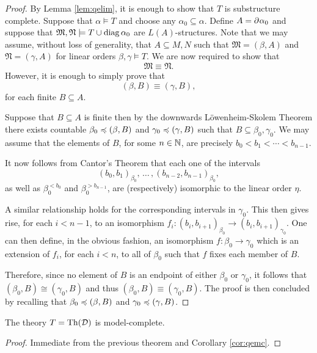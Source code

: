 \begin{proof} By Lemma \ref{lem:qelim}, it is enough to show that $T$ is
	substructure complete.  Suppose that $\alpha\models T$ and choose any
	$\alpha_0\subseteq\alpha$.  Define $A=\partial^{}{}\alpha_0$ and suppose that
	$\mathfrak{M},\mathfrak{N}\models T\cup\operatorname{diag}{\alpha_0}$ are $L(A)$-structures.
	Note that we may assume, without loss of generality, that $A\subseteq M,N$ such
	that $\mathfrak{M}=(\beta,A)$ and $\mathfrak{N}=(\gamma,A)$ for linear orders
	$\beta,\gamma\models T$.
	We are now required to show that
	\begin{equation}
		\mathfrak{M}\equiv\mathfrak{N}.
	\end{equation}
	However, it is enough to simply prove that
	\begin{equation}
		(\beta,B)\equiv(\gamma,B),
	\end{equation}
	for each finite $B\subseteq A$.

	Suppose that $B\subseteq A$ is finite then by the downwards
	L\"owenheim-Skolem Theorem there exists countable $\beta_0\preccurlyeq(\beta,B)$ and
	$\gamma_0\preccurlyeq(\gamma,B)$ such that $B\subseteq\beta_0,\gamma_0$.  We may assume
	that the elements of $B$, for some $n\in\mathbb{N}$, are precisely
	$b_0<b_1<\dotsb<b_{n-1}$.

	It now follows from Cantor's Theorem that each one of the intervals
	\begin{equation}
		(b_0,b_1)_{\beta_0},\,\dotsc\,,(b_{n-2},b_{n-1})_{\beta_0},
	\end{equation}
	as well as $\beta_0^{<b_0}$ and $\beta_0^{>b_{n-1}}$, are (respectively)
	isomorphic to the linear order $\eta$.

	A similar relationship holds for the corresponding intervals in $\gamma_0$.
	This then gives rise, for each $i<n-1$, to an isomorphism
	$f_{i}\colon(b_{i},b_{i+1})_{\beta_{0}}\to(b_{i},b_{i+1})_{\gamma_{0}}$.
	One can then define, in the obvious fashion, an isomorphism
	$f\colon\beta_0\to\gamma_0$ which is an extension of $f_i$, for each $i<n$, to
	all of $\beta_0$ such that $f$ fixes each member of $B$.

	Therefore, since no element of $B$ is an endpoint of either $\beta_0$ or
	$\gamma_0$, it follows that $(\beta_0,B)\cong(\gamma_0,B)$ and thus
	$(\beta_0,B)\equiv(\gamma_0,B)$.  The proof is then concluded by recalling that
	$\beta_0\preccurlyeq(\beta,B)$ and $\gamma_0\preccurlyeq(\gamma,B)$.
\end{proof}

\begin{cor}
	The theory $T=\operatorname{Th}(\mathcal{D})$ is model-complete.
\end{cor}
\begin{proof}
	Immediate from the previous theorem and Corollary \ref{cor:qemc}.
\end{proof}

